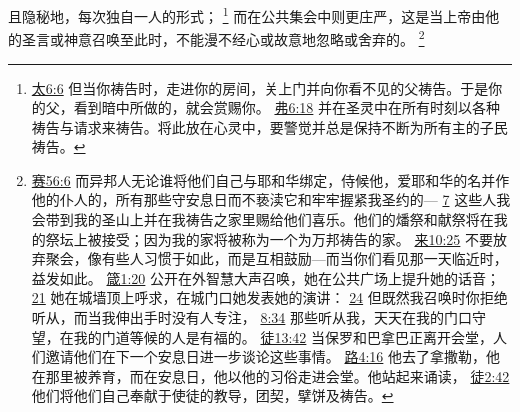 \documentclass[12pt, a4paper, oneside]{ctexart}
\begin{document}
	且隐秘地，每次独自一人的形式；
	\footnote {
		\href{https://biblehub.com/matthew/6-6.htm}{太6:6} 但当你祷告时，走进你的房间，关上门并向你看不见的父祷告。于是你的父，看到暗中所做的，就会赏赐你。
		\href{https://biblehub.com/ephesians/6-18.htm}{弗6:18} 并在圣灵中在所有时刻以各种祷告与请求来祷告。将此放在心灵中，要警觉并总是保持不断为所有主的子民祷告。
	}
	而在公共集会中则更庄严，这是当上帝由他的圣言或神意召唤至此时，不能漫不经心或故意地忽略或舍弃的。
	\footnote {
		\href{https://biblehub.com/isaiah/56-6.htm}{赛56:6} 而异邦人无论谁将他们自己与耶和华绑定，侍候他，爱耶和华的名并作他的仆人的，所有那些守安息日而不亵渎它和牢牢握紧我圣约的---
		\href{https://biblehub.com/isaiah/56-7.htm}{7} 这些人我会带到我的圣山上并在我祷告之家里赐给他们喜乐。他们的燔祭和献祭将在我的祭坛上被接受；因为我的家将被称为一个为万邦祷告的家。
		\href{https://biblehub.com/hebrews/10-25.htm}{来10:25} 不要放弃聚会，像有些人习惯于如此，而是互相鼓励---而当你们看见那一天临近时，益发如此。
		\href{https://biblehub.com/proverbs/1-20.htm}{箴1:20} 公开在外智慧大声召唤，她在公共广场上提升她的话音；
		\href{https://biblehub.com/proverbs/1-21.htm}{21} 她在城墙顶上呼求，在城门口她发表她的演讲：
		\href{https://biblehub.com/proverbs/1-24.htm}{24} 但既然我召唤时你拒绝听从，而当我伸出手时没有人专注，
		\href{https://biblehub.com/proverbs/8-34.htm}{8:34} 那些听从我，天天在我的门口守望，在我的门道等候的人是有福的。
		\href{https://biblehub.com/acts/13-42.htm}{徒13:42} 当保罗和巴拿巴正离开会堂，人们邀请他们在下一个安息日进一步谈论这些事情。
		\href{https://biblehub.com/luke/4-16.htm}{路4:16} 他去了拿撒勒，他在那里被养育，而在安息日，他以他的习俗走进会堂。他站起来诵读，
		\href{https://biblehub.com/acts/2-42.htm}{徒2:42} 他们将他们自己奉献于使徒的教导，团契，擘饼及祷告。
	}
\end{document}
